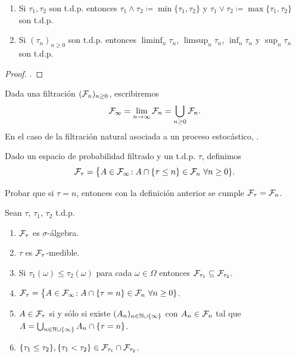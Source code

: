 \begin{prop}%
\leavevmode
\begin{enumerate}[label=\uptext{(\arabic*)}]
\item Si $\tau_1,\tau_2$ son t.d.p. entonces $\tau_1\wedge\tau_2\coloneqq\min\{\tau_1,\tau_2\}$ y $\tau_1\vee\tau_2\coloneqq\max\{\tau_1,\tau_2\}$ son t.d.p.
\item Si $(\tau_n)_{n\geq0}$ son t.d.p. entonces $\liminf_n\tau_n$, $\limsup_n\tau_n$, $\inf_n\tau_n$ y $\sup_n\tau_n$ son t.d.p.
\end{enumerate}
\end{prop}

\begin{proof}
\uexer.
\end{proof}

Dada una filtración $(\mathcal{F}_n)_{n\geq0}$, escribiremos
\[\mathcal{F}_\infty=\lim_{n\to\infty}\mathcal{F}_n=\bigcup_{n\geq0}\mathcal{F}_n.\]
En el caso de la filtración natural asociada a un proceso estocástico, .

\begin{defn}
Dado un espacio de probabilidad filtrado y un t.d.p. $\tau$, definimos
\[\mathcal{F}_\tau=\big\{A\in\mathcal{F}_\infty\!:A\cap\{\tau\leq n\}\in\mathcal{F}_n~\forall n\geq0\}.\]
\end{defn}

\begin{ex}
Probar que si $\tau=n$, entonces con la definición anterior se cumple $\mathcal{F}_\tau=\mathcal{F}_n$.
\end{ex}

\begin{prop}
Sean $\tau$, $\tau_1$, $\tau_2$ t.d.p.
\begin{enumerate}[label=\uptext{(\arabic*)}]
\item $\mathcal{F}_\tau$ es $\sigma$-álgebra.
\item $\tau$ es $\mathcal{F}_\tau$-medible.
\item Si $\tau_1(\omega)\leq\tau_2(\omega)$ para cada $\omega\in\Omega$ entonces $\mathcal{F}_{\tau_1}\subseteq\mathcal{F}_{\tau_2}$.
\item $\mathcal{F}_\tau=\big\{A\in\mathcal{F}_\infty\!:A\cap\{\tau= n\}\in\mathcal{F}_n~\forall n\geq0\}$.
\item $A\in\mathcal{F}_\tau$ si y sólo si existe $(A_n)_{n\in\mathbb{N}\cup\{\infty\}}$ con $A_n\in\mathcal{F}_n$ tal que $A=\bigcup_{n\in\mathbb{N}\cup\{\infty\}}A_n\cap\{\tau=n\}$.
\item $\{\tau_1\leq\tau_2\},\{\tau_1<\tau_2\}\in\mathcal{F}_{\tau_1}\cap\mathcal{F}_{\tau_2}$.
\end{enumerate}
\end{prop}

